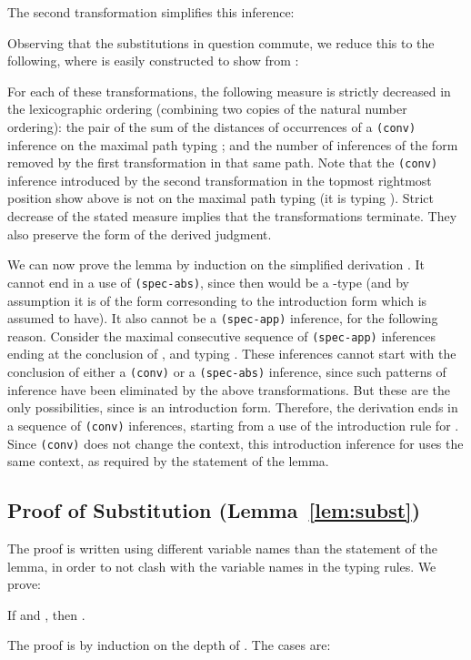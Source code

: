 \documentclass[copyright]{eptcs}
\begin{document}
The second transformation simplifies this inference:

\noindent Observing that the substitutions in question commute,
we reduce this to the following, where  is easily
constructed to show  from :


\noindent For each of these transformations, the following measure is
strictly decreased in the lexicographic ordering (combining two copies
of the natural number ordering): the pair of the sum of the distances
of occurrences of a \texttt{(conv)} inference on the maximal path
typing ; and the number of inferences of the form removed by the
first transformation in that same path.  Note that the \texttt{(conv)}
inference introduced by the second transformation in the topmost
rightmost position show above is not on the maximal path typing 
(it is typing ).  Strict decrease of the stated measure implies
that the transformations terminate.  They also preserve the form of
the derived judgment.

We can now prove the lemma by induction on the simplified derivation
.  It cannot end in a use of \texttt{(spec-abs)}, since
then  would be a -type (and by assumption it is of the
form corresonding to the introduction form which  is assumed to
have).  It also cannot be a \texttt{(spec-app)} inference, for the
following reason.  Consider the maximal consecutive sequence  of
\texttt{(spec-app)} inferences ending at the conclusion of
, and typing .  These inferences cannot start with the
conclusion of either a \texttt{(conv)} or a \texttt{(spec-abs)}
inference, since such patterns of inference have been eliminated by
the above transformations.  But these are the only possibilities, since
 is an introduction form.  Therefore, the derivation 
ends in a sequence of \texttt{(conv)} inferences, starting from a use
of the introduction rule for .  Since \texttt{(conv)} does not change
the context, this introduction inference for  uses the same context,
as required by the statement of the lemma.

\subsection{Proof of Substitution (Lemma~\ref{lem:subst})}
\label{sec:subst}

The proof is written using different variable names than the statement
of the lemma, in order to not clash with the variable names in the
typing rules. We prove:

If  and ,
then .

The proof is by induction on the depth of . The cases are:
\end{document}
